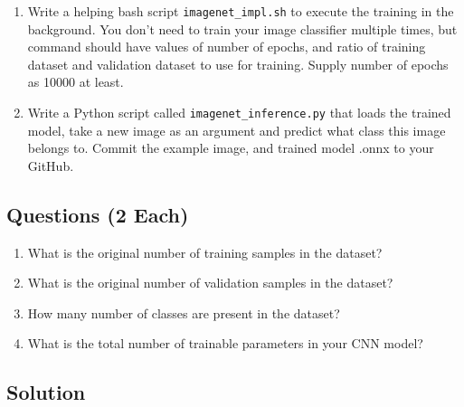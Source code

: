 \documentclass[12pt, xcolor=dvipsnames,svgnames,x11names]{article}
\begin{document}
\begin{enumerate}
\begin{enumerate}
\item You should be able to write your script in such a way that it should take command line argument such as number of epochs to train, ratio of training dataset and validation dataset to use for training. 

\item At the end of the training, a plot should be saved that should display loss and accuracy as a function of epochs. Commit the plot to the GitHub and provide the file in PDF submission.

\end{enumerate}

\item Write a helping bash script \texttt{imagenet_impl.sh} to execute the training in the background. You don't need to train your image classifier multiple times, but command should have values of number of epochs, and ratio of training dataset and validation dataset to use for training. Supply number of epochs as 10000 at least.

\item Write a Python script called \texttt{imagenet_inference.py} that loads the trained model, take a new image as an argument and predict what class this image belongs to.
Commit the example image, and trained model .onnx to your GitHub. 


\end{enumerate}



\subsection{Questions \hfill \textbf{(2 Each)}}


\begin{enumerate}
\item What is the original number of training samples in the dataset?
\item What is the original number of validation samples in the dataset?

\item How many number of classes are present in the dataset?

\item What is the total number of trainable parameters in your CNN model?

\end{enumerate}


\subsection{Solution}
\end{document}
